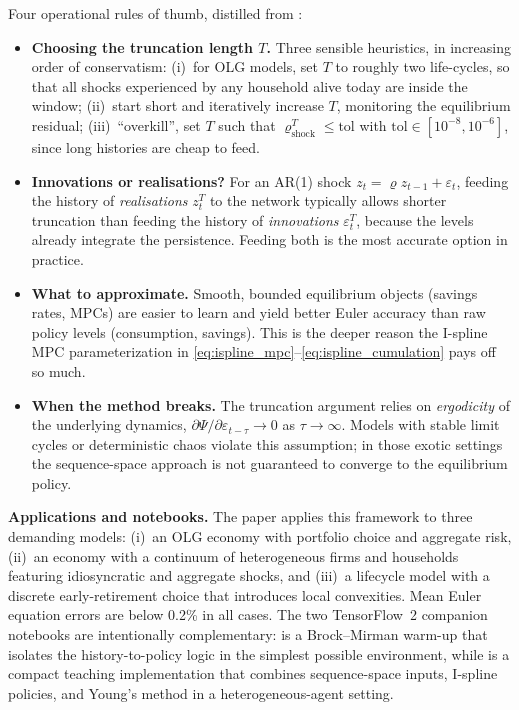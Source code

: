 \documentclass[11pt,a4paper]{report}
\begin{document}
\begin{remarkbox}
\small
Four operational rules of thumb, distilled from \citet{azinovicyangzemlicka2025sequencespace}:

\begin{itemize}[itemsep=2pt]
\item \textbf{Choosing the truncation length $T$.}  Three sensible heuristics, in increasing order of conservatism: (i)~for OLG models, set $T$ to roughly two life-cycles, so that all shocks experienced by any household alive today are inside the window; (ii)~start short and iteratively increase $T$, monitoring the equilibrium residual; (iii)~``overkill'', set $T$ such that $\varrho_{\text{shock}}^T \le \text{tol}$ with $\text{tol} \in [10^{-8}, 10^{-6}]$, since long histories are cheap to feed.

\item \textbf{Innovations or realisations?}  For an AR(1) shock $z_t = \varrho z_{t-1} + \varepsilon_t$, feeding the history of \emph{realisations} $z_t^T$ to the network typically allows shorter truncation than feeding the history of \emph{innovations} $\varepsilon_t^T$, because the levels already integrate the persistence.  Feeding both is the most accurate option in practice.

\item \textbf{What to approximate.}  Smooth, bounded equilibrium objects (savings rates, MPCs) are easier to learn and yield better Euler accuracy than raw policy levels (consumption, savings).  This is the deeper reason the I-spline MPC parameterization in \eqref{eq:ispline_mpc}--\eqref{eq:ispline_cumulation} pays off so much.

\item \textbf{When the method breaks.}  The truncation argument relies on \emph{ergodicity} of the underlying dynamics, $\partial\Psi/\partial\varepsilon_{t-\tau} \to 0$ as $\tau \to \infty$.  Models with stable limit cycles or deterministic chaos violate this assumption; in those exotic settings the sequence-space approach is not guaranteed to converge to the equilibrium policy.
\end{itemize}
\end{remarkbox}

\medskip\noindent\textbf{Applications and notebooks.}
The paper applies this framework to three demanding models: (i)~an OLG economy with portfolio choice and aggregate risk, (ii)~an economy with a continuum of heterogeneous firms and households featuring idiosyncratic and aggregate shocks, and (iii)~a lifecycle model with a discrete early-retirement choice that introduces local convexities.  Mean Euler equation errors are below 0.2\% in all cases.  The two TensorFlow~2 companion notebooks are intentionally complementary:  is a Brock--Mirman warm-up that isolates the history-to-policy logic in the simplest possible environment, while  is a compact teaching implementation that combines sequence-space inputs, I-spline policies, and Young's method in a heterogeneous-agent setting.
\end{document}
